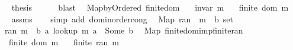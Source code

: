 \begin{isabellebody}
\isanewline
\ \ \isamarkupfalse%
\ {\isacharquery}{\kern0pt}thesis\isanewline
\ \ \ \ \isamarkupfalse%
\ blast\isanewline
{}\isamarkupfalse%
%
\endisatagproof
{\isafoldproof}%
%
\isadelimproof
\isanewline
%
\endisadelimproof
\isanewline
{}\isamarkupfalse%
\ {\isacharparenleft}{\kern0pt}\ Map{\isacharunderscore}{\kern0pt}by{\isacharunderscore}{\kern0pt}Ordered{\isacharparenright}{\kern0pt}\ finite{\isacharunderscore}{\kern0pt}dom{\isacharcolon}{\kern0pt}\isanewline
\ \ \ {\isachardoublequoteopen}invar\ m{\isachardoublequoteclose}\isanewline
\ \ \ {\isachardoublequoteopen}finite\ {\isacharparenleft}{\kern0pt}dom\ m{\isacharparenright}{\kern0pt}{\isachardoublequoteclose}\isanewline
%
\isadelimproof
\ \ %
\endisadelimproof
%
\isatagproof
{}\isamarkupfalse%
\ assms\isanewline
\ \ \isamarkupfalse%
\ {\isacharparenleft}{\kern0pt}simp\ add{\isacharcolon}{\kern0pt}\ dom{\isacharunderscore}{\kern0pt}inorder{\isacharunderscore}{\kern0pt}cong{\isacharparenright}{\kern0pt}%
\endisatagproof
{\isafoldproof}%
%
\isadelimproof
\isanewline
%
\endisadelimproof
\isanewline
{}\isamarkupfalse%
\ {\isacharparenleft}{\kern0pt}\ Map{\isacharparenright}{\kern0pt}\ ran\ {\isacharcolon}{\kern0pt}{\isacharcolon}{\kern0pt}\ {\isachardoublequoteopen}{\isacharprime}{\kern0pt}m\ {\isasymRightarrow}\ {\isacharprime}{\kern0pt}b\ set{\isachardoublequoteclose}\ \isanewline
\ \ {\isachardoublequoteopen}ran\ m\ {\isasymequiv}\ {\isacharbraceleft}{\kern0pt}b{\isachardot}{\kern0pt}\ {\isasymexists}a{\isachardot}{\kern0pt}\ lookup\ m\ a\ {\isacharequal}{\kern0pt}\ Some\ b{\isacharbraceright}{\kern0pt}{\isachardoublequoteclose}\isanewline
%
\isadeliminvisible
\isanewline
%
\endisadeliminvisible
%
\isataginvisible
{}\isamarkupfalse%
\ {\isacharparenleft}{\kern0pt}\ Map{\isacharparenright}{\kern0pt}\ finite{\isacharunderscore}{\kern0pt}dom{\isacharunderscore}{\kern0pt}imp{\isacharunderscore}{\kern0pt}finite{\isacharunderscore}{\kern0pt}ran{\isacharcolon}{\kern0pt}\isanewline
\ \ \ {\isachardoublequoteopen}finite\ {\isacharparenleft}{\kern0pt}dom\ m{\isacharparenright}{\kern0pt}{\isachardoublequoteclose}\isanewline
\ \ \ {\isachardoublequoteopen}finite\ {\isacharparenleft}{\kern0pt}ran\ m{\isacharparenright}{\kern0pt}{\isachardoublequoteclose}%
\endisataginvisible
{\isafoldinvisible}%
%
\isadeliminvisible
\isanewline
%
\endisadeliminvisible

\end{isabellebody}

